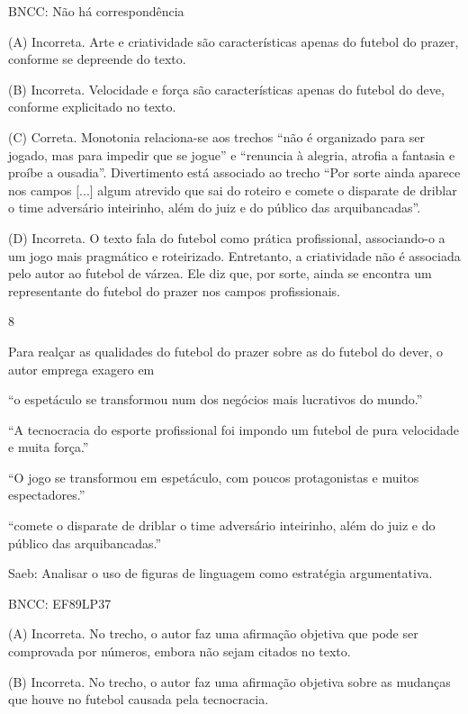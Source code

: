BNCC: Não há correspondência

(A) Incorreta. Arte e criatividade são características apenas do futebol
do prazer, conforme se depreende do texto.

(B) Incorreta. Velocidade e força são características apenas do futebol
do deve, conforme explicitado no texto.

(C) Correta. Monotonia relaciona-se aos trechos ``não é organizado para
ser jogado, mas para impedir que se jogue'' e ``renuncia à alegria,
atrofia a fantasia e proíbe a ousadia''. Divertimento está associado ao
trecho ``Por sorte ainda aparece nos campos {[}...{]} algum atrevido que
sai do roteiro e comete o disparate de driblar o time adversário
inteirinho, além do juiz e do público das arquibancadas''.

(D) Incorreta. O texto fala do futebol como prática profissional,
associando-o a um jogo mais pragmático e roteirizado. Entretanto, a
criatividade não é associada pelo autor ao futebol de várzea. Ele diz
que, por sorte, ainda se encontra um representante do futebol do prazer
nos campos profissionais.

\num{8}

Para realçar as qualidades do futebol do prazer sobre as do futebol do
dever, o autor emprega exagero em

\begin{escolha}
\item ``o espetáculo se transformou num dos negócios mais lucrativos do
mundo.''

\item ``A tecnocracia do esporte profissional foi impondo um futebol de
pura velocidade e muita força.''

\item ``O jogo se transformou em espetáculo, com poucos protagonistas e
muitos espectadores.''

\item ``comete o disparate de driblar o time adversário inteirinho, além do
juiz e do público das arquibancadas.''
\end{escolha}

Saeb: Analisar o uso de figuras de linguagem como estratégia
argumentativa.

BNCC: EF89LP37

(A) Incorreta. No trecho, o autor faz uma afirmação objetiva que pode
ser comprovada por números, embora não sejam citados no texto.

(B) Incorreta. No trecho, o autor faz uma afirmação objetiva sobre as
mudanças que houve no futebol causada pela tecnocracia.

